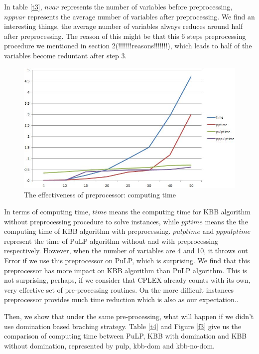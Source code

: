 \documentclass[a4paper,11pt]{article}
\begin{document}
In table \ref{t3}, $nvar$ represents the number of variables before preprocessing, $nppvar$ represents the average number of variables after preprocessing.  We find an interesting things, the average number of variables always reduces around half after preprocessing. The reason of this might be that this 6 steps preprocessing procedure we mentioned in section 2(!!!!!!!reasons!!!!!!!), which leads to half of the variables become reduntant after step 3. 

\begin{figure}[H]
\begin{center}
\includegraphics[scale=0.6]{3}
\end{center}
\caption{The effectiveness of preprocessor: computing time \label{numfigp}}
\end{figure}

In terms of computing time, $time$ means the computing time for KBB algorithm without preprocessing procedure to solve instances,  while $pptime$ means the the computing time of KBB algorithm with preprocessing. $pulptime$ and $pppulptime$ represent the time of PuLP algorithm without and with preprocessing respectively. However, when the number of variables are 4 and 10, it throws out Error if we use this preprocessor on PuLP, which is surprising. We find that this preprocessor has more impact on KBB algorithm than PuLP algorithm. This is not surprising, perhaps, if we consider that CPLEX already counts with its own, very effective set of pre-processing routines. On the more difficult instances preprocessor provides much time reduction which is also as our expectation..

Then, we show that under the same pre-processing, what will happen if we didn't use domination based braching strategy. Table \ref{t4} and Figure \ref{f3} give us the comparison of computing time between PuLP, KBB with domination and KBB without domination, represented by pulp, kbb-dom and kbb-no-dom.
\end{document}
